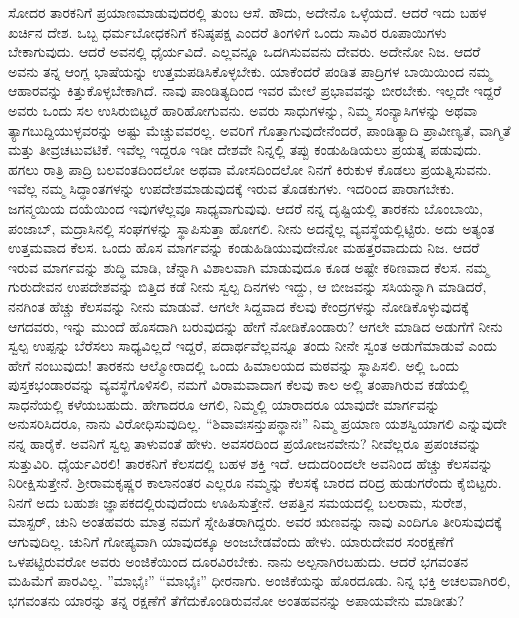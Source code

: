 ಸೋದರ ತಾರಕನಿಗೆ ಪ್ರಯಾಣಮಾಡುವುದರಲ್ಲಿ ತುಂಬ ಆಸೆ. ಹೌದು, ಅದೇನೊ ಒಳ್ಳೆಯದೆ. ಆದರೆ ಇದು ಬಹಳ ಖರ್ಚಿನ ದೇಶ. ಒಬ್ಬ ಧರ್ಮಬೋಧಕನಿಗೆ ಕನಿಷ್ಠಪಕ್ಷ ಎಂದರೆ ತಿಂಗಳಿಗೆ ಒಂದು ಸಾವಿರ ರೂಪಾಯಿಗಳು ಬೇಕಾಗುವುದು. ಆದರೆ ಅವನಲ್ಲಿ ಧೈರ್ಯವಿದೆ. ಎಲ್ಲವನ್ನೂ ಒದಗಿಸುವವನು ದೇವರು. ಅದೇನೋ ನಿಜ. ಆದರೆ ಅವನು ತನ್ನ ಆಂಗ್ಲ ಭಾಷೆಯನ್ನು ಉತ್ತಮಪಡಿಸಿಕೊಳ್ಳಬೇಕು. ಯಾಕೆಂದರೆ ಪಂಡಿತ ಪಾದ್ರಿಗಳ ಬಾಯಿಯಿಂದ ನಮ್ಮ ಆಹಾರವನ್ನು ಕಿತ್ತುಕೊಳ್ಳಬೇಕಾಗಿದೆ. ನಾವು ಪಾಂಡಿತ್ಯದಿಂದ ಇವರ ಮೇಲೆ ಪ್ರಭಾವವನ್ನು ಬೀರಬೇಕು. ಇಲ್ಲದೇ ಇದ್ದರೆ ಅವರು ಒಂದು ಸಲ ಉಸಿರುಬಿಟ್ಟರೆ ಹಾರಿಹೋಗುವನು. ಅವರು ಸಾಧುಗಳನ್ನು, ನಿಮ್ಮ ಸಂನ್ಯಾಸಿಗಳನ್ನು ಅಥವಾ ತ್ಯಾಗಬುದ್ದಿಯುಳ್ಳವರನ್ನು ಅಷ್ಟು ಮೆಚ್ಚುವವರಲ್ಲ. ಅವರಿಗೆ ಗೊತ್ತಾಗುವುದೇನೆಂದರೆ, ಪಾಂಡಿತ್ಯಾದಿ ಪ್ರಾವೀಣ್ಯತೆ, ವಾಗ್ಮಿತೆ ಮತ್ತು ತೀವ್ರಚಟುವಟಿಕೆ. ಇವೆಲ್ಲ ಇದ್ದರೂ ಇಡೀ ದೇಶವೇ ನಿನ್ನಲ್ಲಿ ತಪ್ಪು ಕಂಡುಹಿಡಿಯಲು ಪ್ರಯತ್ನ ಪಡುವುದು. ಹಗಲು ರಾತ್ರಿ ಪಾದ್ರಿ ಬಲವಂತದಿಂದಲೋ ಅಥವಾ ಮೋಸದಿಂದಲೋ ನಿನಗೆ ಕಿರುಕುಳ ಕೊಡಲು ಪ್ರಯತ್ನಿಸುವನು. ಇವೆಲ್ಲ ನಮ್ಮ ಸಿದ್ಧಾಂತಗಳನ್ನು ಉಪದೇಶಮಾಡುವುದಕ್ಕೆ ಇರುವ ತೊಡಕುಗಳು. ಇದರಿಂದ ಪಾರಾಗಬೇಕು. ಜಗನ್ಮಯಿಯ ದಯೆಯಿಂದ ಇವುಗಳೆಲ್ಲವೂ ಸಾಧ್ಯವಾಗುವುವು. ಆದರೆ ನನ್ನ ದೃಷ್ಟಿಯಲ್ಲಿ ತಾರಕನು ಬೊಂಬಾಯಿ, ಪಂಜಾಬ್, ಮದ್ರಾಸಿನಲ್ಲಿ ಸಂಘಗಳನ್ನು ಸ್ಥಾಪಿಸುತ್ತಾ ಹೋಗಲಿ. ನೀನು ಅದನ್ನೆಲ್ಲ ವ್ಯವಸ್ಥೆಯಲ್ಲಿಟ್ಟಿರು. ಅದು ಅತ್ಯಂತ ಉತ್ತಮವಾದ ಕೆಲಸ. ಒಂದು ಹೊಸ ಮಾರ್ಗವನ್ನು ಕಂಡುಹಿಡಿಯುವುದೇನೋ ಮಹತ್ತರವಾದುದು ನಿಜ. ಆದರೆ ಇರುವ ಮಾರ್ಗವನ್ನು ಶುದ್ಧಿ ಮಾಡಿ, ಚೆನ್ನಾಗಿ ವಿಶಾಲವಾಗಿ ಮಾಡುವುದೂ ಕೂಡ ಅಷ್ಟೇ ಕಠಿಣವಾದ ಕೆಲಸ. ನಮ್ಮ ಗುರುದೇವನ ಉಪದೇಶವನ್ನು ಬಿತ್ತಿದ ಕಡೆ ನೀನು ಸ್ವಲ್ಪ ದಿನಗಳು ಇದ್ದು, ಆ ಬೀಜವನ್ನು ಸಸಿಯನ್ನಾಗಿ ಮಾಡಿದರೆ, ನನಗಿಂತ ಹೆಚ್ಚು ಕೆಲಸವನ್ನು ನೀನು ಮಾಡುವೆ. ಆಗಲೇ ಸಿದ್ದವಾದ ಕೆಲವು ಕೇಂದ್ರಗಳನ್ನು ನೋಡಿಕೊಳ್ಳುವುದಕ್ಕೆ ಆಗದವರು, ಇನ್ನು ಮುಂದೆ ಹೊಸದಾಗಿ ಬರುವುದನ್ನು ಹೇಗೆ ನೋಡಿಕೊಂಡಾರು? ಆಗಲೇ ಮಾಡಿದ ಅಡುಗೆಗೆ ನೀನು ಸ್ವಲ್ಪ ಉಪ್ಪನ್ನು ಬೆರೆಸಲು ಸಾಧ್ಯವಿಲ್ಲದೆ ಇದ್ದರೆ, ಪದಾರ್ಥವೆಲ್ಲವನ್ನೂ ತಂದು ನೀನೇ ಸ್ವಂತ ಅಡುಗೆಮಾಡುವೆ ಎಂದು ಹೇಗೆ ನಂಬುವುದು! ತಾರಕನು ಆಲ್ಮೋರಾದಲ್ಲಿ ಒಂದು ಹಿಮಾಲಯದ ಮಠವನ್ನು ಸ್ಥಾಪಿಸಲಿ. ಅಲ್ಲಿ ಒಂದು ಪುಸ್ತಕಭಂಡಾರವನ್ನು ವ್ಯವಸ್ಥೆಗೊಳಿಸಲಿ, ನಮಗೆ ವಿರಾಮವಾದಾಗ ಕೆಲವು ಕಾಲ ಅಲ್ಲಿ ತಂಪಾಗಿರುವ ಕಡೆಯಲ್ಲಿ ಸಾಧನೆಯಲ್ಲಿ ಕಳೆಯಬಹುದು. ಹೇಗಾದರೂ ಆಗಲಿ, ನಿಮ್ಮಲ್ಲಿ ಯಾರಾದರೂ ಯಾವುದೇ ಮಾರ್ಗವನ್ನು ಅನುಸರಿಸಿದರೂ, ನಾನು ವಿರೋಧಿಸುವುದಿಲ್ಲ. ``ಶಿವಾವಃಸನ್ತುಪನ್ಥಾನಃ'' ನಿಮ್ಮ ಪ್ರಯಾಣ ಯಶಸ್ವಿಯಾಗಲಿ ಎನ್ನುವುದೇ ನನ್ನ ಹಾರೈಕೆ.\enginline{-} ಅವನಿಗೆ ಸ್ವಲ್ಪ ತಾಳುವಂತೆ ಹೇಳು. ಅವಸರದಿಂದ ಪ್ರಯೋಜನವೇನು? ನೀವೆಲ್ಲರೂ ಪ್ರಪಂಚವನ್ನು ಸುತ್ತುವಿರಿ. ಧೈರ್ಯವಿರಲಿ! ತಾರಕನಿಗೆ ಕೆಲಸದಲ್ಲಿ ಬಹಳ ಶಕ್ತಿ ಇದೆ. ಆದುದರಿಂದಲೇ ಅವನಿಂದ ಹೆಚ್ಚು ಕೆಲಸವನ್ನು ನಿರೀಕ್ಷಿಸುತ್ತೇನೆ. ಶ‍್ರೀರಾಮಕೃಷ್ಣರ ಕಾಲಾನಂತರ ಎಲ್ಲರೂ ನಮ್ಮನ್ನು ಕೆಲಸಕ್ಕೆ ಬಾರದ ದರಿದ್ರ ಹುಡುಗರೆಂದು ಕೈಬಿಟ್ಟರು. ನಿನಗೆ ಅದು ಬಹುಶಃ ಜ್ಞಾಪಕದಲ್ಲಿರುವುದೆಂದು ಊಹಿಸುತ್ತೇನೆ. ಆಪತ್ತಿನ ಸಮಯದಲ್ಲಿ ಬಲರಾಮ, ಸುರೇಶ, ಮಾಸ್ಟರ್‌, ಚುನಿ ಅಂತಹವರು ಮಾತ್ರ ನಮಗೆ ಸ್ನೇಹಿತರಾಗಿದ್ದರು. ಅವರ ಋಣವನ್ನು ನಾವು ಎಂದಿಗೂ ತೀರಿಸುವುದಕ್ಕೆ ಆಗುವುದಿಲ್ಲ. ಚುನಿಗೆ ಗೋಪ್ಯವಾಗಿ ಯಾವುದಕ್ಕೂ ಅಂಜಬೇಡವೆಂದು ಹೇಳು. ಯಾರುದೇವರ ಸಂರಕ್ಷಣೆಗೆ ಒಳಪಟ್ಟಿರುವರೋ ಅವರು ಅಂಜಿಕೆಯಿಂದ ದೂರವಿರಬೇಕು. ನಾನು ಅಲ್ಪನಾಗಿರಬಹುದು. ಆದರೆ ಭಗವಂತನ ಮಹಿಮೆಗೆ ಪಾರವಿಲ್ಲ. ''ಮಾಭೈಃ” “ಮಾಭೈಃ” ಧೀರನಾಗು. ಅಂಜಿಕೆಯನ್ನು ಹೊರದೂಡು. ನಿನ್ನ ಭಕ್ತಿ ಅಚಲವಾಗಿರಲಿ, ಭಗವಂತನು ಯಾರನ್ನು ತನ್ನ ರಕ್ಷಣೆಗೆ ತೆಗೆದುಕೊಂಡಿರುವನೋ ಅಂತಹವನನ್ನು ಅಪಾಯವೇನು ಮಾಡೀತು?

